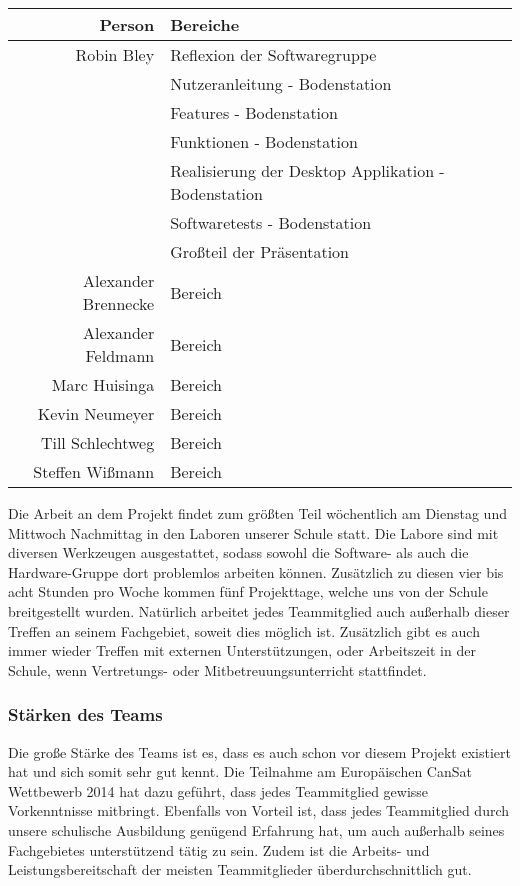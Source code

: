 \begin{table}[H]
	\centering
	\begin{tabular}{rl}
		\toprule
		\textbf{Person} & \textbf{Bereiche} \\
		\midrule
		Robin Bley & Reflexion der Softwaregruppe \\
		 & Nutzeranleitung - Bodenstation \\
		 & Features - Bodenstation \\
		 & Funktionen - Bodenstation\\
		 & Realisierung der Desktop Applikation - Bodenstation \\
		 & Softwaretests - Bodenstation\\
		 & Großteil der Präsentation\\
		Alexander Brennecke & Bereich \\
		Alexander Feldmann & Bereich \\
		Marc Huisinga & Bereich \\
		Kevin Neumeyer & Bereich \\
		Till Schlechtweg & Bereich \\
		Steffen Wißmann & Bereich \\
		\bottomrule
	\end{tabular}
\end{table}

Die Arbeit an dem Projekt findet zum größten Teil wöchentlich am Dienstag und Mittwoch Nachmittag in den Laboren unserer Schule statt. Die Labore sind mit diversen Werkzeugen ausgestattet, sodass sowohl die Software- als auch die Hardware-Gruppe dort problemlos arbeiten können. Zusätzlich zu diesen vier bis acht Stunden pro Woche kommen fünf Projekttage, welche uns von der Schule breitgestellt wurden. Natürlich arbeitet jedes Teammitglied auch außerhalb dieser Treffen an seinem Fachgebiet, soweit dies möglich ist. Zusätzlich gibt es auch immer wieder Treffen mit externen Unterstützungen, oder Arbeitszeit in der Schule, wenn Vertretungs- oder Mitbetreuungsunterricht stattfindet.

\subsubsection{Stärken des Teams}
Die große Stärke des Teams ist es, dass es auch schon vor diesem Projekt existiert hat und sich somit sehr gut kennt. Die Teilnahme am Europäischen CanSat Wettbewerb 2014 hat dazu geführt, dass jedes Teammitglied gewisse Vorkenntnisse mitbringt. Ebenfalls von Vorteil ist, dass jedes Teammitglied durch unsere schulische Ausbildung genügend Erfahrung hat, um auch außerhalb seines Fachgebietes unterstützend tätig zu sein. Zudem ist die Arbeits- und Leistungsbereitschaft der meisten Teammitglieder überdurchschnittlich gut.

